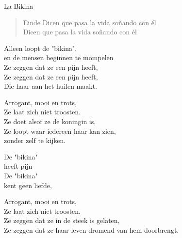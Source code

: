 \begin{song}[joropo]{La Bikina}

\begin{verse}{Einde}
Dicen que pasa la vida soñando con él\\
Dicen que pasa la vida soñando con él 
\end{verse}
\end{song}

\clearpage
\begin{translation}
Alleen loopt de "bikina",\\
en de mensen beginnen te mompelen\\
Ze zeggen dat ze een pijn heeft,\\
Ze zeggen dat ze een pijn heeft,\\
Die haar aan het huilen maakt.\vspace{\wlskip}

Arrogant, mooi en trots,\\
Ze laat zich niet troosten.\\
Ze doet alsof ze de koningin is,\\
Ze loopt waar iedereen haar kan zien,\\
zonder zelf te kijken.\vspace{\wlskip}

De "bikina"\\
heeft pijn\\
De "bikina"\\
kent geen liefde,\vspace{\wlskip}

Arrogant, mooi en trots,\\
Ze laat zich niet troosten.\\
Ze zeggen dat ze in de steek is gelaten,\\
Ze zeggen dat ze haar leven dromend van hem doorbrengt.\\
\end{translation}
